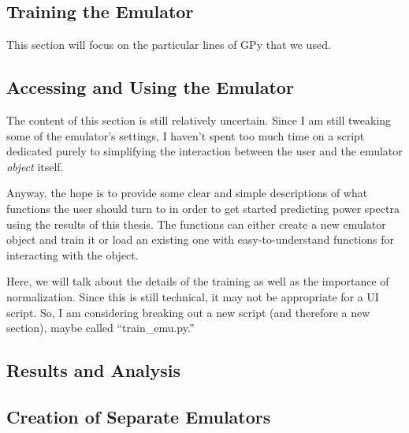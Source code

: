 \documentclass[11pt]{article}
\begin{document}
\begin{centering}
\subsection{Training the Emulator}
\end{centering}


This section will focus on the particular lines of GPy that we used.

\begin{centering}
\subsection{Accessing and Using the Emulator}
\end{centering}


The content of this section is still relatively uncertain. Since I am still tweaking some of the emulator's settings, I haven't spent too much time on a script dedicated purely to simplifying the interaction between the user and the emulator \textit{object} itself.

Anyway, the hope is to provide some clear and simple descriptions of what functions the user should turn to in order to get started predicting power spectra using the results of this thesis. The functions can either create a new emulator object and train it or load an existing one with easy-to-understand functions for interacting with the object.

Here, we will talk about the details of the training as well as the importance of normalization. Since this is still technical, it may not be appropriate for a UI script. So, I am considering breaking out a new script (and therefore a new section), maybe called ``train\_emu.py.''

\begin{centering}
\section{Results and Analysis}
\end{centering}

\begin{centering}
\subsection{Creation of Separate Emulators}
\end{centering}
\end{document}
